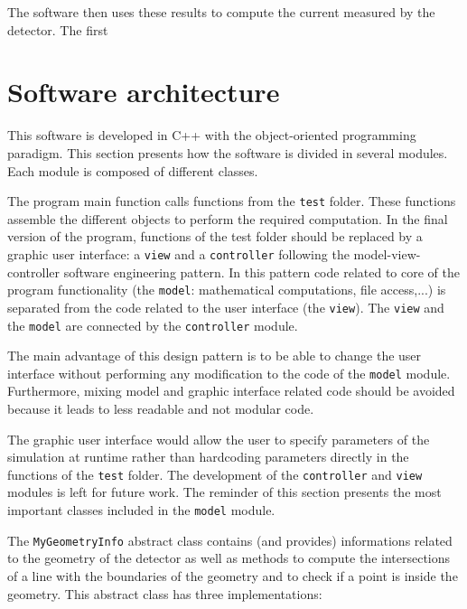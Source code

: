 \documentclass[11pt]{article}
\begin{document}
	The software then uses these results to compute the current measured by the
	detector. The first

\section{Software architecture}

	This software is developed in C++ with the object-oriented programming paradigm.
	This section presents how the software is divided in several modules. Each module
	is composed of different classes.

	The program main function calls functions from the \texttt{test} folder. These functions
	assemble the different objects to perform the required computation. In the
	final version of the program, functions of the test folder should be replaced
	by a graphic user interface: a \texttt{view} and a \texttt{controller} following
	the model-view-controller software engineering pattern. In this pattern code
	related to core of the program functionality (the \texttt{model}: mathematical computations, file access,...)
	is separated from the code related to the user interface (the \texttt{view}).
	The \texttt{view} and the
	\texttt{model} are connected by the \texttt{controller} module.

	The main advantage of this design pattern is to be able to change the user interface without
	performing any modification to the code of the \texttt{model} module. Furthermore,
	mixing model and graphic interface related code should be avoided because it leads to
	less readable and not modular code.

	The graphic user interface would allow the user to specify
	parameters of the simulation at runtime rather than hardcoding parameters
	directly in the functions of the \texttt{test} folder.
	The development of the \texttt{controller} and \texttt{view} modules
	is left for future work. The reminder of this section presents the most important classes
	included in the \texttt{model} module.

	The \texttt{MyGeometryInfo} abstract class contains (and provides) informations
	related to the
	geometry of the detector as well as methods to compute the intersections of a
	line with the boundaries of the geometry and to check if a point is inside
	the geometry. This abstract class has three implementations:
\end{document}
